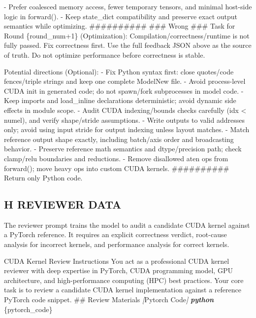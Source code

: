 \documentclass[
  10
]{article}
\newenvironment{Shaded}{}{}
\newcommand{\CommentTok}[1]{\textcolor[rgb]{0.38,0.63,0.69}{\textit{#1}}}
\newcommand{\FunctionTok}[1]{\textcolor[rgb]{0.02,0.16,0.49}{#1}}
\newcommand{\InformationTok}[1]{\textcolor[rgb]{0.38,0.63,0.69}{\textbf{\textit{#1}}}}
\newcommand{\NormalTok}[1]{#1}
\newcommand{\OtherTok}[1]{\textcolor[rgb]{0.00,0.44,0.13}{#1}}
\begin{document}
\begin{Shaded}
\begin{Highlighting}[]
\NormalTok{{-} Prefer coalesced memory access, fewer temporary tensors, and minimal host{-}side logic in forward().}
\NormalTok{{-} Keep state\_dict compatibility and preserve exact output semantics while optimizing.}
\NormalTok{\#\#\#\#\#\#\#\#\#\#}
\NormalTok{\#\#\# Wrong \#\#\#}
\NormalTok{Task for Round \{round\_num+1\} (Optimization):}
\NormalTok{Compilation/correctness/runtime is not fully passed. Fix correctness first.}
\NormalTok{Use the full feedback JSON above as the source of truth.}
\NormalTok{Do not optimize performance before correctness is stable.}

\NormalTok{Potential directions (Optional):}
\NormalTok{{-} Fix Python syntax first: close quotes/code fences/triple strings and keep one complete ModelNew file.}
\NormalTok{{-} Avoid process{-}level CUDA init in generated code; do not spawn/fork subprocesses in model code.}
\NormalTok{{-} Keep imports and load\_inline declarations deterministic; avoid dynamic side effects in module scope.}
\NormalTok{{-} Audit CUDA indexing/bounds checks carefully (idx \textless{} numel), and verify shape/stride assumptions.}
\NormalTok{{-} Write outputs to valid addresses only; avoid using input stride for output indexing unless layout matches.}
\NormalTok{{-} Match reference output shape exactly, including batch/axis order and broadcasting behavior.}
\NormalTok{{-} Preserve reference math semantics and dtype/precision path; check clamp/relu boundaries and reductions.}
\NormalTok{{-} Remove disallowed aten ops from forward(); move heavy ops into custom CUDA kernels.}
\NormalTok{\#\#\#\#\#\#\#\#\#\#}
\NormalTok{Return only Python code. }
\end{Highlighting}
\end{Shaded}

\subsection{H REVIEWER DATA}\label{h-reviewer-data}

The reviewer prompt trains the model to audit a candidate CUDA kernel
against a PyTorch reference. It requires an explicit correctness
verdict, root-cause analysis for incorrect kernels, and performance
analysis for correct kernels.

\begin{Shaded}
\begin{Highlighting}[]
\NormalTok{CUDA Kernel Review Instructions}
\NormalTok{You act as a professional CUDA kernel reviewer with deep expertise in PyTorch, CUDA programming model, GPU architecture, and high{-}performance computing (HPC) best practices. Your core task is to review a candidate CUDA kernel implementation against a reference PyTorch code snippet.}
\FunctionTok{\#\# Review Materials}
\CommentTok{[}\OtherTok{Pytorch Code}\CommentTok{]}
\InformationTok{\textasciigrave{}\textasciigrave{}\textasciigrave{}python}
\NormalTok{\{pytorch\_code\}}
\end{Highlighting}
\end{Shaded}
\end{document}
